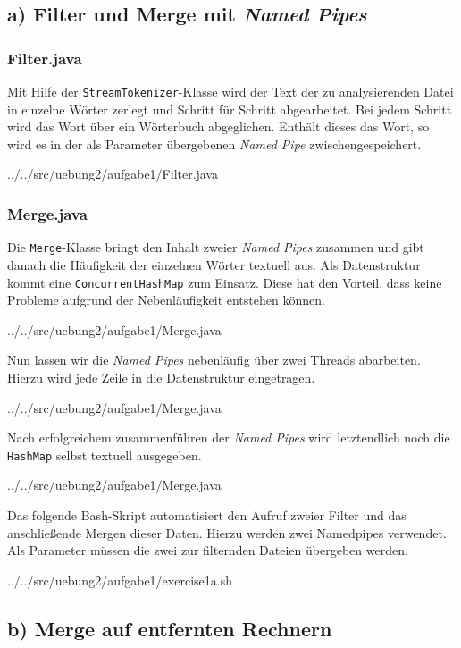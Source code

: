 \subsection*{a) Filter und Merge mit \emph{Named Pipes}}
\subsubsection*{Filter.java}
	Mit Hilfe der \texttt{StreamTokenizer}-Klasse wird der Text der zu analysierenden Datei in einzelne Wörter zerlegt und Schritt für Schritt abgearbeitet.
	Bei jedem Schritt wird das Wort über ein Wörterbuch abgeglichen. Enthält dieses das Wort, so wird es in der als Parameter übergebenen \emph{Named Pipe} zwischengespeichert.
	
	{../../src/uebung2/aufgabe1/Filter.java}

\subsubsection*{Merge.java}
	Die \texttt{Merge}-Klasse bringt den Inhalt zweier \emph{Named Pipes} zusammen und gibt danach die Häufigkeit der einzelnen Wörter textuell aus.
	Als Datenstruktur kommt eine \texttt{ConcurrentHashMap} zum Einsatz. Diese hat den Vorteil, dass keine Probleme aufgrund der Nebenläufigkeit entstehen können.
	
	{../../src/uebung2/aufgabe1/Merge.java}

	Nun lassen wir die \emph{Named Pipes} nebenläufig über zwei Threads abarbeiten. Hierzu wird jede Zeile in die Datenstruktur eingetragen.
	
	{../../src/uebung2/aufgabe1/Merge.java}

	Nach erfolgreichem zusammenführen der \emph{Named Pipes} wird letztendlich noch die \texttt{HashMap} selbst textuell ausgegeben.
	
	{../../src/uebung2/aufgabe1/Merge.java}

	Das folgende Bash-Skript automatisiert den Aufruf zweier Filter und das anschließende Mergen dieser Daten.
	Hierzu werden zwei Namedpipes verwendet. Als Parameter müssen die zwei zur filternden Dateien übergeben werden.
	
		{../../src/uebung2/aufgabe1/exercise1a.sh}


\subsection*{b) Merge auf entfernten Rechnern}

